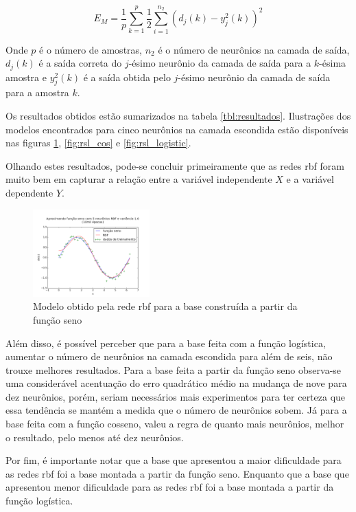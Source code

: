 \documentclass[conference]{IEEEtran}
\begin{document}
$$E_{M} = \frac{1}{p}\sum_{k=1}^{p}\frac{1}{2}\sum_{i=1}^{n_{2}}
(d_{j}(k)-y_{j}^{2}(k))^{2}$$

Onde $p$ é o número de amostras, $n_{2}$ é o número de neurônios na camada de 
saída, $d_{j}(k)$ é a saída correta do $j$-ésimo neurônio da camada de saída 
para a $k$-ésima amostra  e $y_{j}^{2}(k)$ é a saída obtida pelo $j$-ésimo 
neurônio da camada de saída para a amostra $k$.

Os resultados obtidos estão sumarizados na tabela \ref{tbl:resultados}. 
Ilustrações dos modelos encontrados para cinco neurônios na camada escondida 
estão disponíveis nas figuras \ref{fig:rsl_seno}, \ref{fig:rsl_cos} e 
\ref{fig:rsl_logistic}.

Olhando estes resultados, pode-se concluir primeiramente que as redes \ac*{rbf} 
foram muito bem em capturar a relação entre a variável independente $X$ e a 
variável dependente $Y$.

\begin{figure}[b]
	\caption{Modelo obtido pela rede \ac*{rbf} para a base construída a partir 
		da função seno}
	\label{fig:rsl_seno}
	\centering
	\includegraphics[width=0.40\textwidth]{sin_5v1_all_paper}
\end{figure}

Além disso, é possível perceber que para a base feita com a função logística, 
aumentar o número de neurônios na camada escondida para além de seis, não trouxe 
melhores resultados. Para a base feita a partir da função seno observa-se uma 
considerável acentuação do erro quadrático médio na mudança de nove para dez 
neurônios, porém, seriam necessários mais experimentos para ter certeza que 
essa tendência se mantém a medida que o número de neurônios sobem. Já para a 
base feita com a função cosseno, valeu a regra de quanto mais neurônios, 
melhor o resultado, pelo menos até dez neurônios.

Por fim, é importante notar que a base que apresentou a maior dificuldade para 
as redes \ac*{rbf} foi a base montada a partir da função seno. Enquanto que a
base que apresentou menor dificuldade para as redes \ac*{rbf} foi a base montada 
a partir da função logística.
\end{document}
